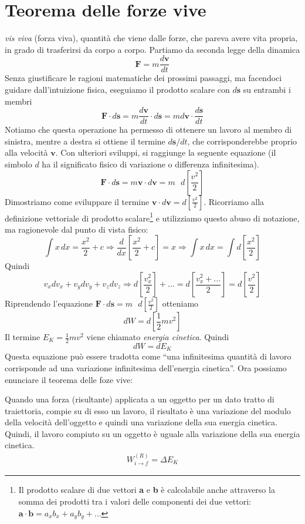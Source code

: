 \section{Teorema delle forze vive}
\textit{vis viva} (forza viva), quantità che viene dalle forze, che pareva avere
vita propria, in grado di trasferirsi da corpo a corpo.
Partiamo da seconda legge della dinamica
\[ \textbf{F} = m\frac{d\textbf{v}}{dt} \]
Senza giustificare le ragioni matematiche dei prossimi passaggi, ma facendoci
guidare dall'intuizione fisica, eseguiamo il prodotto scalare con $d\textbf{s}$
su entrambi i membri
\[ \textbf{F}\cdot d\textbf{s} = m\frac{d\textbf{v}}{dt}\cdot d\textbf{s} = m d\textbf{v}\cdot\frac{d\textbf{s}}{dt} \]
Notiamo che questa operazione ha permesso di ottenere un lavoro al membro di
sinistra, mentre a destra si ottiene il termine $d\mathbf{s}/dt$, che corrisponderebbe
proprio alla velocità $\textbf{v}$. Con ulteriori sviluppi, si raggiunge la
seguente equazione (il simbolo $d$ ha il significato fisico di variazione o
differenza infinitesima).
\[ \textbf{F}\cdot d\textbf{s} = m\textbf{v}\cdot d\textbf{v} = m\text{ }d\left[\frac{v^2}{2}\right] \]
Dimostriamo come sviluppare il termine $\textbf{v}\cdot d\textbf{v} = d\left[\frac{v^2}{2}\right]$.
Ricorriamo alla definizione vettoriale di prodotto scalare\footnote{Il prodotto scalare
di due vettori \textbf{a} e \textbf{b} è calcolabile anche attraverso la somma
dei prodotti tra i valori delle componenti dei due vettori: $\mathbf{a}\cdot\mathbf{b} = a_xb_x + a_yb_y + ...$}
e utilizziamo questo abuso di notazione, ma ragionevole dal punto di vista fisico:
\[ \int x \,dx =  \frac{x^2}{2} + c \Rightarrow \frac{d}{dx}\left[\frac{x^2}{2} + c\right] = x \Rightarrow \int x \,dx = \int d\left[\frac{x^2}{2}\right] \]
Quindi
\[ v_x dv_x + v_y dv_y + v_z dv_z \Rightarrow d\left[\frac{v_x^2}{2}\right] + ... = d\left[\frac{v_x^2 + ...}{2}\right] = d\left[\frac{v^2}{2}\right] \]
Riprendendo l'equazione $\mathbf{F}\cdot d\textbf{s} = m\text{ }d\left[\frac{v^2}{2}\right]$ otteniamo
\[ dW = d\left[\frac12 mv^2\right] \]
Il termine $E_K = \frac{1}{2}mv^2$ viene chiamato \textit{energia cinetica}. Quindi
\[ dW = dE_K \]
Questa equazione può essere tradotta come ``una infinitesima quantità di lavoro
corrisponde ad una variazione infinitesima dell'energia cinetica''. Ora possiamo
enunciare il teorema delle foze vive:
\vspace{8pt}
\begin{tcolorbox}[colback = red!30, colframe = red!30!black, title = {Teorema dell'energia cinetica (o delle forze vive)}]
    Quando una forza (risultante) applicata a un oggetto per un dato tratto di
    traiettoria, compie su di esso un lavoro, il risultato è una variazione del
    modulo della velocità dell'oggetto e quindi una variazione della sua energia
    cinetica. Quindi, il lavoro compiuto su un oggetto è uguale alla variazione
    della sua energia cinetica.
    \begin{align}
        W_{i\to f}^{(R)} = \Delta E_K\label{forzevive}
    \end{align}
\end{tcolorbox}
\vspace{5pt}

